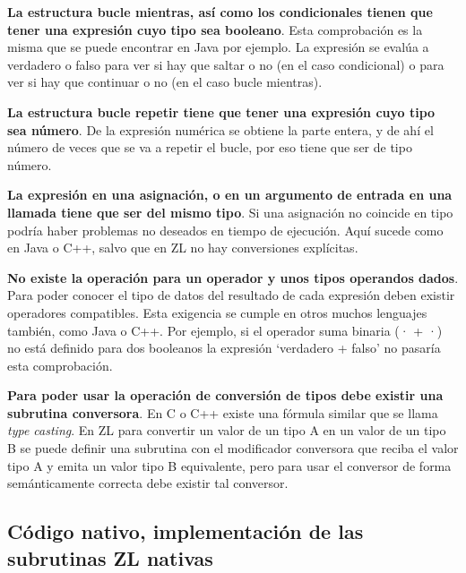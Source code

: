 \documentclass{report}
\begin{document}
	\vspace{10px}
	\noindent
	\textbf{La estructura bucle mientras, así como los condicionales tienen que tener una expresión cuyo tipo sea booleano}. Esta comprobación es la misma que se puede encontrar en Java por ejemplo. La expresión se evalúa a verdadero o falso para ver si hay que saltar o no (en el caso condicional) o para ver si hay que continuar o no (en el caso bucle mientras).
	
	\vspace{10px}
	\noindent
	\textbf{La estructura bucle repetir tiene que tener una expresión cuyo tipo sea número}. De la expresión numérica se obtiene la parte entera, y de ahí el número de veces que se va a repetir el bucle, por eso tiene que ser de tipo número. 
	
	\vspace{10px}
	\noindent
	\textbf{La expresión en una asignación, o en un argumento de entrada en una llamada tiene que ser del mismo tipo}. Si una asignación no coincide en tipo podría haber problemas no deseados en tiempo de ejecución. Aquí sucede como en Java o C++, salvo que en ZL no hay conversiones explícitas.
	
	\vspace{10px}
	\noindent
	\textbf{No existe la operación para un operador y unos tipos operandos dados}. Para poder conocer el tipo de datos del resultado de cada expresión deben existir operadores compatibles. Esta exigencia se cumple en otros muchos lenguajes también, como Java o C++. Por ejemplo, si el operador suma binaria (· + ·) no está definido para dos booleanos la expresión `verdadero + falso' no pasaría esta comprobación.
		
		
	\vspace{10px}
	\noindent
	\textbf{Para poder usar la operación de conversión de tipos debe existir una subrutina conversora}. En C o C++ existe una fórmula similar que se llama \textit{type casting}. En ZL para convertir un valor de un tipo A en un valor de un tipo B se puede definir una subrutina con el modificador conversora que reciba el valor tipo A y emita un valor tipo B equivalente, pero para usar el conversor de forma semánticamente correcta debe existir tal conversor. 
		
	\vspace{10px}

	\subsection{Código nativo, implementación de las subrutinas ZL nativas}
	
\end{document}
